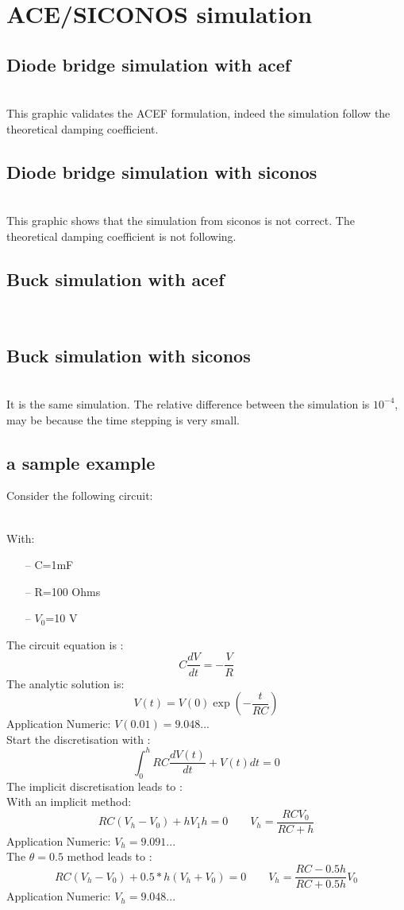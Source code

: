 \section{ACE/SICONOS simulation}

\subsection{Diode bridge simulation with acef}

\\
This graphic validates the ACEF formulation, indeed the simulation follow the theoretical damping coefficient.
\subsection{Diode bridge simulation with siconos}

\\
This graphic shows that the simulation from siconos is not correct. The theoretical damping
coefficient is not following.
\subsection{Buck simulation with acef}

\\
\subsection{Buck simulation with siconos}

\\
It is the same simulation. The relative difference between the simulation is $10^{-4}$, may be because
the time stepping is very small.
\newpage
\subsection{a sample example}
Consider the following circuit:\\
\begin{figure}[h]
\centerline{
 \scalebox{1.0}{
    
 }
}\end{figure}
\\
With:
\begin{itemize}
  \item[--] C=1mF
  \item[--] R=100 Ohms
  \item[--] $V_{0}$=10 V
\end{itemize}

The circuit equation is :
\[C\frac{dV}{dt}=-\frac{V}{R}\]
The analytic solution is:
\[V(t)=V(0)\exp(-\frac{t}{RC})\]
Application Numeric: $V(0.01)=9.048...$\\
Start the discretisation with :\\
\[\int_{0}^{h}{RC\frac{dV(t)}{dt}+V(t)}dt=0\]
The implicit discretisation leads to :\\
With an implicit method:
\[RC(V_{h}-V_{0})+hV_{1}h=0 \qquad V_{h}=\frac{RCV_{0}}{RC+h}\]
Application Numeric: $V_{h}=9.091...$\\
The $\theta=0.5$ method leads to :
\[RC(V_{h}-V_{0})+0.5*h(V_{h}+V_{0})=0 \qquad V_{h} = \frac{RC-0.5h}{RC+0.5h}V_{0}\]
Application Numeric: $V_{h}=9.048...$\\
